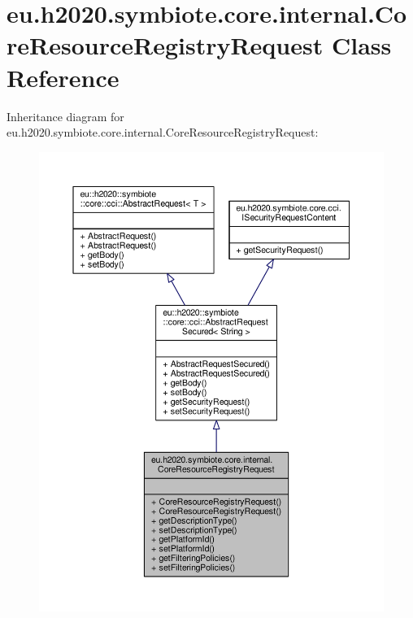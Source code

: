 \hypertarget{classeu_1_1h2020_1_1symbiote_1_1core_1_1internal_1_1CoreResourceRegistryRequest}{}\section{eu.\+h2020.\+symbiote.\+core.\+internal.\+Core\+Resource\+Registry\+Request Class Reference}
\label{classeu_1_1h2020_1_1symbiote_1_1core_1_1internal_1_1CoreResourceRegistryRequest}


Inheritance diagram for eu.\+h2020.\+symbiote.\+core.\+internal.\+Core\+Resource\+Registry\+Request\+:\nopagebreak
\begin{figure}[H]
\begin{center}
\leavevmode
\includegraphics[width=350pt]{classeu_1_1h2020_1_1symbiote_1_1core_1_1internal_1_1CoreResourceRegistryRequest__inherit__graph}
\end{center}
\end{figure}


